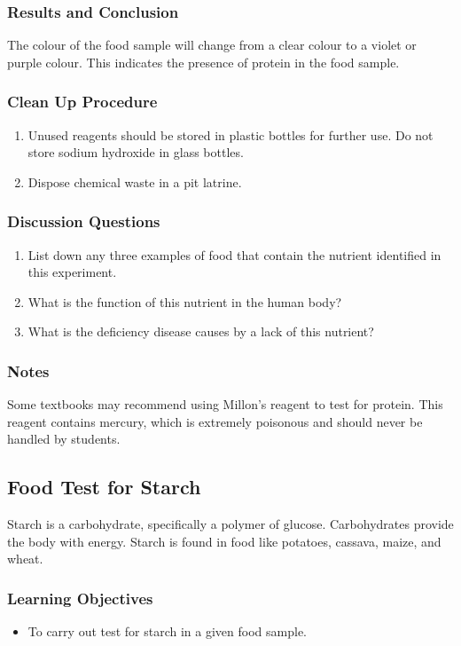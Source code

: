 \subsubsection*{Results and Conclusion}
The colour of the food sample will change from a clear colour to a violet or purple colour. This indicates the presence of protein in the food sample.

\subsubsection*{Clean Up Procedure}
\begin{enumerate}
\item{Unused reagents should be stored in plastic bottles for further use. Do not store sodium hydroxide in glass bottles.}
\item{Dispose chemical waste in a pit latrine.}
\end{enumerate}

\subsubsection*{Discussion Questions}
\begin{enumerate}
\item{List down any three examples of food that contain the nutrient identified in this experiment.}
\item{What is the function of this nutrient in the human body?}
\item{What is the deficiency disease causes by a lack of this nutrient?}
\end{enumerate}

\subsubsection*{Notes}
Some textbooks may recommend using Millon's reagent to test for protein. This reagent contains mercury, which is extremely poisonous and should never be handled by students.

\subsection{Food Test for Starch}
Starch is a carbohydrate, specifically a polymer of glucose. Carbohydrates provide the body with energy. Starch is found in food like potatoes, cassava, maize, and wheat.

\subsubsection*{Learning Objectives}
\begin{itemize}
\item{To carry out test for starch in a given food sample.}
\end{itemize}

